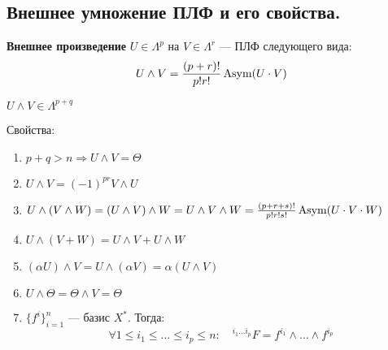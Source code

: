 \subsection{Внешнее умножение ПЛФ и его свойства.}
\begin{definition}
    \textbf{Внешнее произведение} $U\in\Lambda^p$ на $V\in\Lambda^r$ --- ПЛФ следующего вида:
    $$U\wedge V=\frac{(p+r)!}{p!r!}\operatorname{\text{Asym}}(U\cdot V)$$

    $U\wedge V\in\Lambda^{p+q}$
\end{definition}
Свойства:
\begin{enumerate}
    \item $p+q>n\Rightarrow U\wedge V=\Theta$
    \item $U\wedge V=(-1)^{pr} V\wedge U$
    \item $U\wedge (V\wedge W)=(U\wedge V)\wedge W=U\wedge V\wedge W=\frac{(p+r+s)!}{p!r!s!}\operatorname{\text{Asym}}(U\cdot V\cdot W)$
    \item $U\wedge (V+W)=U\wedge V + U\wedge W$
    \item $(\alpha U)\wedge V=U\wedge (\alpha V)=\alpha(U\wedge V)$
    \item $U\wedge\Theta=\Theta\wedge V=\Theta$
    \item $\{f^i\}_{i=1}^n$ --- базис $X^*$. Тогда:
          $$\forall 1\leq i_1\leq \ldots \leq i_p\leq n:\quad {}^{i_1\ldots i_p}F=f^{i_1}\wedge\ldots \wedge f^{i_p}$$
\end{enumerate}
